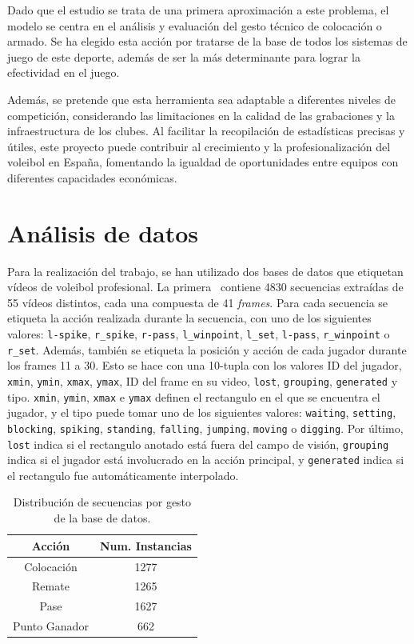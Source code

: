 \documentclass[12pt]{report} %
\begin{document}
    Dado que el estudio se trata de una primera aproximación a este problema,
    el modelo se centra en el análisis y evaluación del gesto técnico de
    colocación o armado. Se ha elegido esta acción por tratarse de la base de
    todos los sistemas de juego de este deporte, además de ser la más
    determinante para lograr la efectividad en el juego.

    Además, se pretende que esta herramienta sea adaptable a diferentes niveles de
    competición, considerando las limitaciones en la calidad de las grabaciones y
    la infraestructura de los clubes. Al facilitar la recopilación de estadísticas
    precisas y útiles, este proyecto puede contribuir al crecimiento y la
    profesionalización del voleibol en España, fomentando la igualdad de
    oportunidades entre equipos con diferentes capacidades económicas.


    \chapter{Análisis de datos}
    \label{cahp:datos}
    Para la realización del trabajo, se han utilizado dos bases de datos que
    etiquetan vídeos de voleibol profesional. La primera~\cite{dataset1} contiene 4830
    secuencias extraídas de 55 vídeos distintos, cada una compuesta de 41
    \textit{frames}. Para cada secuencia se etiqueta la acción realizada durante
    la secuencia, con uno de los siguientes valores: \verb!l-spike!,
    \verb!r_spike!, \verb!r-pass!, \verb!l_winpoint!, \verb!l_set!,
    \verb!l-pass!, \verb!r_winpoint! o \verb!r_set!. Además, también se etiqueta
    la posición y acción de cada jugador durante los frames 11 a 30. Esto se
    hace con una 10-tupla con los valores ID del jugador, \verb!xmin!,
    \verb!ymin!, \verb!xmax!, \verb!ymax!, ID del frame en su video,
    \verb!lost!, \verb!grouping!, \verb!generated! y tipo. \verb!xmin!,
    \verb!ymin!, \verb!xmax! e \verb!ymax! definen el rectangulo en el que se
    encuentra el jugador, y el tipo puede tomar uno de los siguientes valores:
    \verb!waiting!, \verb!setting!, \verb!blocking!, \verb!spiking!,
    \verb!standing!, \verb!falling!, \verb!jumping!, \verb!moving! o
    \verb!digging!. Por último, \verb!lost! indica si el rectangulo anotado está
    fuera del campo de visión, \verb!grouping! indica si el jugador está
    involucrado en la acción principal, y \verb!generated! indica si el
    rectangulo fue automáticamente interpolado.

    \begin{table}[H]
        \begin{tabular}{@{}cc@{}}
            \toprule
            Acción & Num. Instancias\\
            \midrule
            Colocación    & 1277\\
            Remate        & 1265\\
            Pase          & 1627\\
            Punto Ganador &  662\\
            \bottomrule
        \end{tabular}
        \caption{Distribución de secuencias por gesto de la base de datos.}
    \end{table}
\end{document}
